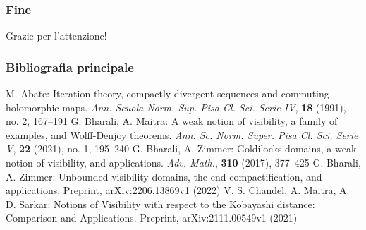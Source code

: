 \begin{frame}
  \frametitle{Fine}
  \begin{center}
    \LARGE Grazie per l'attenzione!
  \end{center}
\end{frame}

\begin{frame}
  \frametitle{Bibliografia principale}
  \begin{thebibliography}{widest entry}
     M. Abate: Iteration theory, compactly divergent sequences and commuting holomorphic maps. \textit{ Ann. Scuola Norm. Sup. Pisa Cl. Sci. Serie IV}, \textbf{18} (1991), no. 2, 167--191
     G. Bharali, A. Maitra: A weak notion of visibility, a family of examples, and Wolff-Denjoy theorems. \textit{ Ann. Sc. Norm. Super. Pisa Cl. Sci. Serie V}, \textbf{22} (2021), no. 1, 195--240
     G. Bharali, A. Zimmer: Goldilocks domains, a weak notion of visibility, and applications. \textit{ Adv. Math.}, \textbf{310} (2017), 377--425
     G. Bharali, A. Zimmer: Unbounded visibility domains, the end compactification, and applications. Preprint, arXiv:2206.13869v1 (2022)
     V. S. Chandel, A. Maitra, A. D. Sarkar: Notions of Visibility with respect to the Kobayashi distance: Comparison and Applications. Preprint, arXiv:2111.00549v1 (2021)
  \end{thebibliography}
\end{frame}